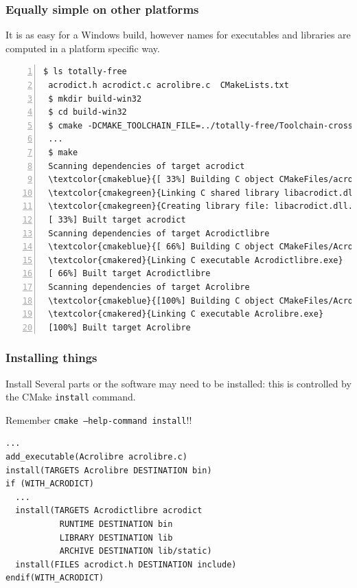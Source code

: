 \documentclass[compress,slidestop,table
              ]
               {beamer}
\newcommand{\fname}[1]{\texttt{#1}}
\begin{document}
\begin{frame}[fragile]
\frametitle{Equally simple on other platforms}
It is as easy for a Windows build, however
names for executables and libraries are computed
in a
\textcolor{cmakeblue}{platform}
\textcolor{cmakered}{specific}
\textcolor{cmakegreen}{way}.
\begin{center}
\begin{Verbatim}[commandchars=\\\{\},fontsize=\tiny,numbers=left,frame=topline,label=CMake + MinGW Makefile]
 $ ls totally-free
 acrodict.h acrodict.c acrolibre.c  CMakeLists.txt
 $ mkdir build-win32
 $ cd build-win32
 $ cmake -DCMAKE_TOOLCHAIN_FILE=../totally-free/Toolchain-cross-linux.cmake ../totally-free
 ...
 $ make
 Scanning dependencies of target acrodict
 \textcolor{cmakeblue}{[ 33%] Building C object CMakeFiles/acrodict.dir/acrodict.c.obj}
 \textcolor{cmakegreen}{Linking C shared library libacrodict.dll}
 \textcolor{cmakegreen}{Creating library file: libacrodict.dll.a}
 [ 33%] Built target acrodict
 Scanning dependencies of target Acrodictlibre
 \textcolor{cmakeblue}{[ 66%] Building C object CMakeFiles/Acrodictlibre.dir/acrolibre.c.obj}
 \textcolor{cmakered}{Linking C executable Acrodictlibre.exe}
 [ 66%] Built target Acrodictlibre
 Scanning dependencies of target Acrolibre
 \textcolor{cmakeblue}{[100%] Building C object CMakeFiles/Acrolibre.dir/acrolibre.c.obj}
 \textcolor{cmakered}{Linking C executable Acrolibre.exe}
 [100%] Built target Acrolibre
\end{Verbatim}
\end{center}
\end{frame}

\begin{frame}[fragile]
\frametitle{Installing things}
\begin{block}{Install}
Several parts or the software may need to be installed:
this is controlled by the CMake \lstinline!install! command.

\alert{Remember \fname{cmake --help-command install}!!}
\end{block}
\begin{lstlisting}[basicstyle=\tiny,caption=install command examples]
...
add_executable(Acrolibre acrolibre.c)
install(TARGETS Acrolibre DESTINATION bin)
if (WITH_ACRODICT)
  ...
  install(TARGETS Acrodictlibre acrodict
           RUNTIME DESTINATION bin
           LIBRARY DESTINATION lib
           ARCHIVE DESTINATION lib/static)
  install(FILES acrodict.h DESTINATION include)
endif(WITH_ACRODICT)
\end{lstlisting}
\end{frame}
\end{document}
